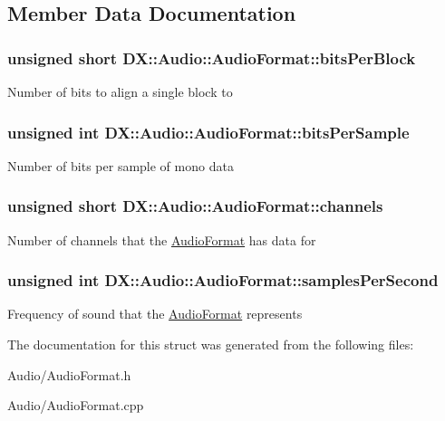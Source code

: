 \subsection{Member Data Documentation}
\hypertarget{struct_d_x_1_1_audio_1_1_audio_format_aa6e6a2856d9afcd3b450f25316557c7b}{
\subsubsection[{bits\-Per\-Block}]{\setlength{\rightskip}{0pt plus 5cm}unsigned short D\-X\-::\-Audio\-::\-Audio\-Format\-::bits\-Per\-Block}}\label{struct_d_x_1_1_audio_1_1_audio_format_aa6e6a2856d9afcd3b450f25316557c7b}
Number of bits to align a single block to \hypertarget{struct_d_x_1_1_audio_1_1_audio_format_a2e624e38652b39d310149e7a2259a4ee}{
\subsubsection[{bits\-Per\-Sample}]{\setlength{\rightskip}{0pt plus 5cm}unsigned int D\-X\-::\-Audio\-::\-Audio\-Format\-::bits\-Per\-Sample}}\label{struct_d_x_1_1_audio_1_1_audio_format_a2e624e38652b39d310149e7a2259a4ee}
Number of bits per sample of mono data \hypertarget{struct_d_x_1_1_audio_1_1_audio_format_a99e6f97c11da52c68bb1cedc98dfe341}{
\subsubsection[{channels}]{\setlength{\rightskip}{0pt plus 5cm}unsigned short D\-X\-::\-Audio\-::\-Audio\-Format\-::channels}}\label{struct_d_x_1_1_audio_1_1_audio_format_a99e6f97c11da52c68bb1cedc98dfe341}
Number of channels that the \hyperlink{struct_d_x_1_1_audio_1_1_audio_format}{Audio\-Format} has data for \hypertarget{struct_d_x_1_1_audio_1_1_audio_format_ae38016a3233f056484d95808eb53f781}{
\subsubsection[{samples\-Per\-Second}]{\setlength{\rightskip}{0pt plus 5cm}unsigned int D\-X\-::\-Audio\-::\-Audio\-Format\-::samples\-Per\-Second}}\label{struct_d_x_1_1_audio_1_1_audio_format_ae38016a3233f056484d95808eb53f781}
Frequency of sound that the \hyperlink{struct_d_x_1_1_audio_1_1_audio_format}{Audio\-Format} represents 

The documentation for this struct was generated from the following files\-:\begin{DoxyCompactItemize}
\item 
Audio/Audio\-Format.\-h\item 
Audio/Audio\-Format.\-cpp\end{DoxyCompactItemize}
